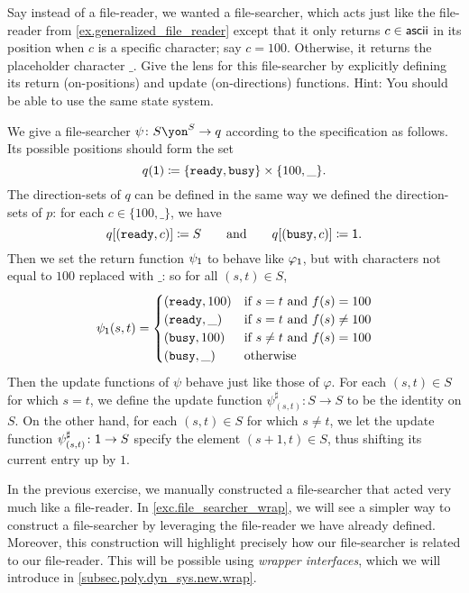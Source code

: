 \documentclass[Book-Poly]{subfiles}
\begin{document}

\begin{exercise} \label{exc.file_searcher}
Say instead of a file-reader, we wanted a file-searcher, which acts just like the file-reader from \cref{ex.generalized_file_reader} except that it only returns $c\in\mathsf{ascii}$ in its position when $c$ is a specific character; say $c=100$.
Otherwise, it returns the placeholder character $\_$.
Give the lens for this file-searcher by explicitly defining its return (on-positions) and update (on-directions) functions.
Hint: You should be able to use the same state system.
\begin{solution}
We give a file-searcher $\psi\colon S\yon^S\to q$ according to the specification as follows.
Its possible positions should form the set
\[
    q(\textsf{1})\coloneqq\{\texttt{ready}, \texttt{busy}\}\times\{100,\_\}.
\]
The direction-sets of $q$ can be defined in the same way we defined the direction-sets of $p$: for each $c\in\{100,\_\}$, we have
\[
    q[(\texttt{ready}, c)]\coloneqq S \qquad\text{and}\qquad q[(\texttt{busy}, c)]\coloneqq\textsf{1}.
\]
Then we set the return function $\psi_{\textsf{1}}$ to behave like $\varphi_{\textsf{1}}$, but with characters not equal to $100$ replaced with $\_$: so for all $(s,t)\in S$,
\begin{align*}
  \psi_{\textsf{1}}(s,t) =
  \begin{cases}
    (\texttt{ready}, 100) &\mbox{if $s=t$ and $f(s)=100$}\\
    (\texttt{ready}, \_) &\mbox{if $s=t$ and $f(s)\neq100$}\\
    (\texttt{busy}, 100) &\mbox{if $s\neq t$ and $f(s)=100$}\\
    (\texttt{busy}, \_) &\mbox{otherwise}\\
  \end{cases}
\end{align*}
Then the update functions of $\psi$ behave just like those of $\varphi$.
For each $(s,t)\in S$ for which $s=t$, we define the update function $\psi^\sharp_{(s,t)}\colon S\to S$ to be the identity on $S$.
On the other hand, for each $(s,t)\in S$ for which $s\neq t$, we let the update function $\psi^\sharp_{(s,t)}\colon \textsf{1}\to S$ specify the element $(s+1, t)\in S$, thus shifting its current entry up by $1$.
\end{solution}
\end{exercise}

In the previous exercise, we manually constructed a file-searcher that acted very much like a file-reader.
In \cref{exc.file_searcher_wrap}, we will see a simpler way to construct a file-searcher by leveraging the file-reader we have already defined.
Moreover, this construction will highlight precisely how our file-searcher is related to our file-reader.
This will be possible using \emph{wrapper interfaces}, which we will introduce in \cref{subsec.poly.dyn_sys.new.wrap}.
\end{document}
